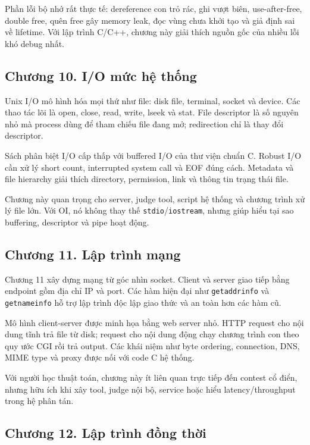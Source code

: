 \documentclass[11pt]{article}
\begin{document}
Phần lỗi bộ nhớ rất thực tế: dereference con trỏ rác, ghi vượt biên, use-after-free,
double free, quên free gây memory leak, đọc vùng chưa khởi tạo và giả định sai
về lifetime. Với lập trình C/C++, chương này giải thích nguồn gốc của nhiều lỗi
khó debug nhất.

\subsection*{Chương 10. I/O mức hệ thống}

Unix I/O mô hình hóa mọi thứ như file: disk file, terminal, socket và device.
Các thao tác lõi là open, close, read, write, lseek và stat. File descriptor là số
nguyên nhỏ mà process dùng để tham chiếu file đang mở; redirection chỉ là thay
đổi descriptor.

Sách phân biệt I/O cấp thấp với buffered I/O của thư viện chuẩn C. Robust I/O
cần xử lý short count, interrupted system call và EOF đúng cách. Metadata và
file hierarchy giải thích directory, permission, link và thông tin trạng thái file.

Chương này quan trọng cho server, judge tool, script hệ thống và chương trình
xử lý file lớn. Với OI, nó không thay thế \texttt{stdio}/\texttt{iostream}, nhưng
giúp hiểu tại sao buffering, descriptor và pipe hoạt động.

\subsection*{Chương 11. Lập trình mạng}

Chương 11 xây dựng mạng từ góc nhìn socket. Client và server giao tiếp bằng
endpoint gồm địa chỉ IP và port. Các hàm hiện đại như \texttt{getaddrinfo} và
\texttt{getnameinfo} hỗ trợ lập trình độc lập giao thức và an toàn hơn các hàm
cũ.

Mô hình client-server được minh họa bằng web server nhỏ. HTTP request cho nội
dung tĩnh trả file từ disk; request cho nội dung động chạy chương trình con theo
quy ước CGI rồi trả output. Các khái niệm như byte ordering, connection, DNS,
MIME type và proxy được nối với code C hệ thống.

Với người học thuật toán, chương này ít liên quan trực tiếp đến contest cổ điển,
nhưng hữu ích khi xây tool, judge nội bộ, service hoặc hiểu latency/throughput
trong hệ phân tán.

\subsection*{Chương 12. Lập trình đồng thời}
\end{document}
